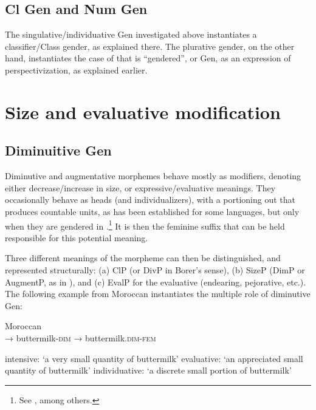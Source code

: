 \subsection{Cl Gen and Num Gen}

The singulative/individuative Gen investigated above instantiates a
classifier/Class gender, as explained there. The plurative gender, on the other
hand, instantiates the case of  that is ``gendered'', or  Gen, as an
expression of perspectivization, as explained earlier.

\section{Size and evaluative modification}\label{sec:fassi:modification}

\subsection{Diminuitive Gen}

Diminutive and augmentative  morphemes behave mostly as modifiers,
denoting either decrease/increase in size, or expressive/evaluative meanings.
They occasionally behave as heads (and individualizers), with a portioning out
that produces countable units, as has been established for some languages, but
only when they are gendered in .\footnote{See \citet{Wiltschko2008%
,deBelder2008%
,Mathieu2012%
,Steriopolo2013%
}, among others.}
It is then the feminine suffix that can be held responsible for this potential
meaning.

Three different meanings of the morpheme can then be distinguished, and
represented structurally: (a) ClP (or DivP in Borer's sense), (b) SizeP (DimP
or AugmentP, as in \citealt{Cinque2014}), and (c) EvalP for the evaluative
(endearing, pejorative, etc.). The following example from Moroccan 
instantiates the multiple role of diminutive Gen:

\begin{exe}
  \ex\label{ex:fassi:37} Moroccan \\
   →  buttermilk-\textsc{dim}  →  buttermilk.\textsc{dim-fem}
  \begin{xlist}
    \ex\label{ex:fassi:37a} intensive: `a very small quantity of buttermilk'
    \ex\label{ex:fassi:37b} evaluative: `an appreciated small quantity of buttermilk' 
    \ex\label{ex:fassi:37c} individuative: `a discrete small portion of buttermilk'
  \end{xlist}
\end{exe}

